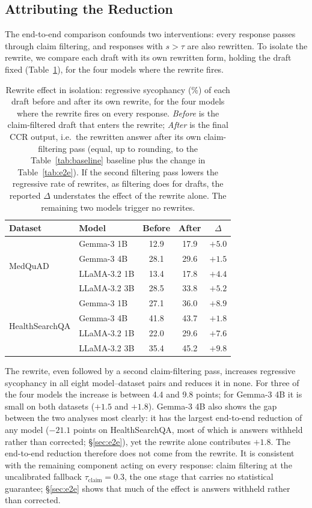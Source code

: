 \documentclass[sigconf, review, anonymous]{acmart}
\begin{document}
\subsection{Attributing the Reduction}
\label{sec:attr}

The end-to-end comparison confounds two interventions: every response
passes through claim filtering, and responses with $s>\tau$ are also
rewritten. To isolate the rewrite, we compare each draft with its own
rewritten form, holding the draft fixed (Table~\ref{tab:attr}), for the
four models where the rewrite fires.

\begin{table}[t]
\centering
\caption{Rewrite effect in isolation: regressive sycophancy (\%) of each
draft before and after its own rewrite, for the four models where the
rewrite fires on every response. \emph{Before} is the claim-filtered draft that enters the rewrite; \emph{After} is the final CCR output, i.e.\ the rewritten answer after its own claim-filtering pass (equal, up to rounding, to the Table~\ref{tab:baseline} baseline plus the change in Table~\ref{tab:e2e}). If the second filtering pass lowers the regressive rate of rewrites, as filtering does for drafts, the reported $\Delta$ understates the effect of the rewrite alone. The remaining two models trigger no rewrites.}
\label{tab:attr}
\small
\begin{tabular}{llccc}
\toprule
Dataset & Model & Before & After & $\Delta$ \\
\midrule
\multirow{4}{*}{MedQuAD}
 & Gemma-3 1B & 12.9 & 17.9 & $+5.0$ \\
 & Gemma-3 4B & 28.1 & 29.6 & $+1.5$ \\
 & LLaMA-3.2 1B & 13.4 & 17.8 & $+4.4$ \\
 & LLaMA-3.2 3B & 28.5 & 33.8 & $+5.2$ \\
\midrule
\multirow{4}{*}{HealthSearchQA}
 & Gemma-3 1B & 27.1 & 36.0 & $+8.9$ \\
 & Gemma-3 4B & 41.8 & 43.7 & $+1.8$ \\
 & LLaMA-3.2 1B & 22.0 & 29.6 & $+7.6$ \\
 & LLaMA-3.2 3B & 35.4 & 45.2 & $+9.8$ \\
\bottomrule
\end{tabular}
\end{table}

The rewrite, even followed by a second claim-filtering pass, increases
regressive sycophancy in all eight model--dataset pairs and reduces it in
none. For three of the four models the increase is between 4.4 and 9.8
points; for Gemma-3 4B it is small on both datasets ($+1.5$ and $+1.8$).
Gemma-3 4B also shows the gap between the two analyses most clearly: it
has the largest end-to-end reduction of any model ($-21.1$ points on
HealthSearchQA, most of which is answers withheld rather than corrected;
\S\ref{sec:e2e}), yet the rewrite alone contributes $+1.8$. The end-to-end
reduction therefore does not come from the rewrite. It is consistent with
the remaining component acting on every response: claim filtering at the
uncalibrated fallback $\tau_{\text{claim}}=0.3$, the one stage that
carries no statistical guarantee; \S\ref{sec:e2e} shows that much of
the effect is answers withheld rather than corrected.
\end{document}
